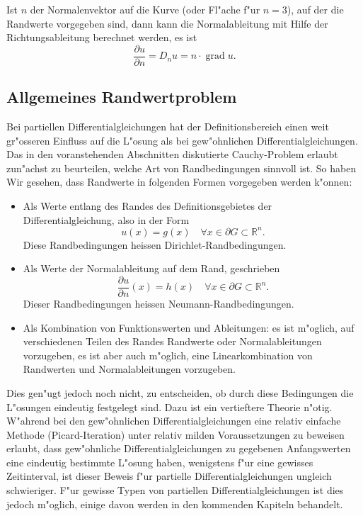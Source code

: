 Ist $n$ der Normalenvektor auf die Kurve (oder Fl"ache f"ur $n=3$), auf
der die Randwerte vorgegeben sind, dann kann die Normalableitung mit 
Hilfe der Richtungsableitung berechnet werden, es ist
\[
\frac{\partial u}{\partial n}=D_nu = n\cdot \operatorname{grad} u.
\]

\subsection{Allgemeines Randwertproblem\label{klassifikation:allgemeines-randwertproblem}}
Bei partiellen Differentialgleichungen hat der Definitionsbereich einen
weit gr"osseren Einfluss auf die L"osung als bei gew"ohnlichen
Differentialgleichungen. Das in den voranstehenden Abschnitten
diskutierte Cauchy-Problem erlaubt zun"achst zu beurteilen, welche
Art von Randbedingungen sinnvoll ist. 
So haben Wir gesehen, dass Randwerte in folgenden Formen vorgegeben
werden k"onnen: 
\begin{itemize}
\item Als Werte entlang des Randes des Definitionsgebietes der
Differentialgleichung, also in der Form
\[
u(x)=g(x)\quad \forall x\in\partial G\subset \mathbb R^n.
\]
Diese Randbedingungen heissen Dirichlet-Randbedingungen.
\item Als Werte der Normalableitung auf dem
Rand, geschrieben
\[
\frac{\partial u}{\partial n}(x)=h(x)\quad\forall x\in\partial G\subset \mathbb R^n.
\]
Dieser Randbedingungen heissen Neumann-Randbedingungen.
\item Als Kombination von Funktionswerten und Ableitungen: es ist
m"oglich, auf verschiedenen Teilen des Randes Randwerte oder Normalableitungen
vorzugeben, es ist aber auch m"oglich, eine Linearkombination
von Randwerten und Normalableitungen vorzugeben.
\end{itemize}
Dies gen"ugt jedoch noch nicht, zu entscheiden, ob durch diese
Bedingungen die L"osungen eindeutig festgelegt sind.
Dazu ist ein vertieftere Theorie n"otig. W"ahrend bei den gew"ohnlichen
Differentialgleichungen eine relativ einfache Methode (Picard-Iteration)
unter relativ milden Voraussetzungen zu beweisen  erlaubt, dass
gew"ohnliche Differentialgleichungen zu gegebenen Anfangswerten eine
eindeutig bestimmte L"osung haben, wenigstens f"ur eine gewisses Zeitinterval,
ist dieser Beweis f"ur partielle Differentialgleichungen ungleich schwieriger.
F"ur gewisse Typen von partiellen Differentialgleichungen ist dies jedoch
m"oglich, einige davon werden in den kommenden Kapiteln behandelt.

